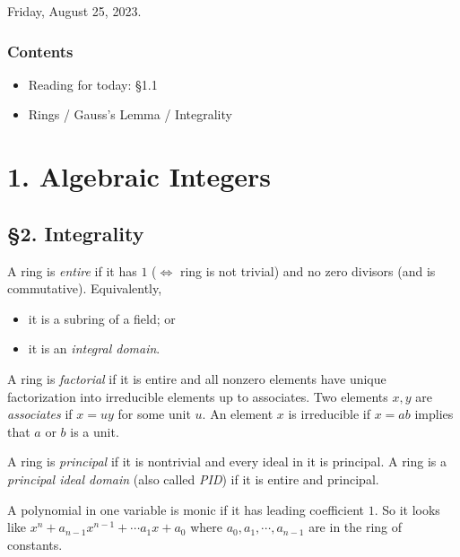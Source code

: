 Friday, August 25, 2023.
\subsubsection*{Contents}
\begin{itemize}
    \item Reading for today: \S 1.1
    \item Rings / Gauss's Lemma / Integrality
\end{itemize}

\section*{1. Algebraic Integers}
\subsection*{\S 2. Integrality}
\begin{definition}
    A ring is \textit{entire} if it has $1$ ($\Leftrightarrow$ ring is not trivial) and no zero divisors (and is commutative). Equivalently,
    \begin{itemize}
        \item it is a subring of a field; or
        \item it is an \textit{integral domain}.
    \end{itemize}
\end{definition}

\begin{definition}
    A ring is \textit{factorial} if it is entire and all nonzero elements have unique factorization into irreducible elements up to associates. Two elements $x, y$ are \textit{associates} if $x = uy$ for some unit $u$. An element $x$ is irreducible if $x = ab$ implies that $a$ or $b$ is a unit.
\end{definition}

\begin{definition}
    A ring is \textit{principal} if it is nontrivial and every ideal in it is principal. A ring is a \textit{principal ideal domain} (also called \textit{PID}) if it is entire and principal.
\end{definition}

\begin{definition}
    A polynomial in one variable is monic if it has leading coefficient $1$. So it looks like $x^n+a_{n-1}x^{n-1}+\cdots a_1 x + a_0$ where $a_0, a_1, \cdots, a_{n-1}$ are in the ring of constants.
\end{definition}

